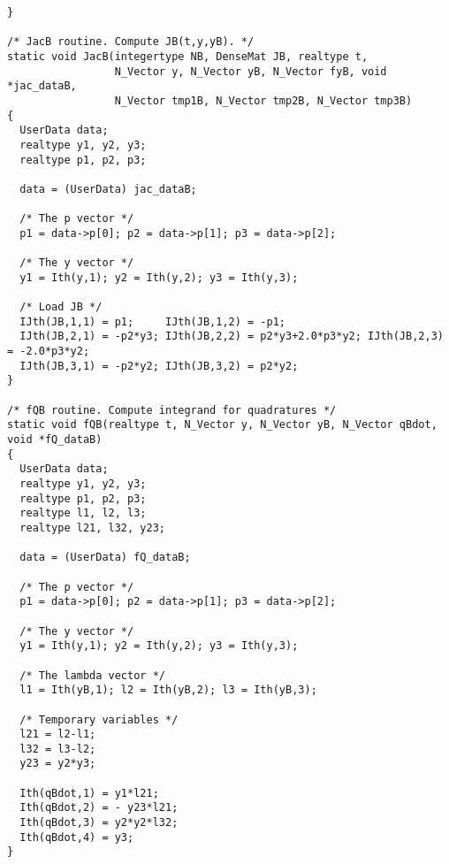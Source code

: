 \begin{verbatim}
}

/* JacB routine. Compute JB(t,y,yB). */
static void JacB(integertype NB, DenseMat JB, realtype t,
                 N_Vector y, N_Vector yB, N_Vector fyB, void *jac_dataB,
                 N_Vector tmp1B, N_Vector tmp2B, N_Vector tmp3B)
{
  UserData data;
  realtype y1, y2, y3;
  realtype p1, p2, p3;
  
  data = (UserData) jac_dataB;

  /* The p vector */
  p1 = data->p[0]; p2 = data->p[1]; p3 = data->p[2];

  /* The y vector */
  y1 = Ith(y,1); y2 = Ith(y,2); y3 = Ith(y,3);

  /* Load JB */
  IJth(JB,1,1) = p1;     IJth(JB,1,2) = -p1; 
  IJth(JB,2,1) = -p2*y3; IJth(JB,2,2) = p2*y3+2.0*p3*y2; IJth(JB,2,3) = -2.0*p3*y2;
  IJth(JB,3,1) = -p2*y2; IJth(JB,3,2) = p2*y2;
}

/* fQB routine. Compute integrand for quadratures */
static void fQB(realtype t, N_Vector y, N_Vector yB, N_Vector qBdot, void *fQ_dataB)
{
  UserData data;
  realtype y1, y2, y3;
  realtype p1, p2, p3;
  realtype l1, l2, l3;
  realtype l21, l32, y23;

  data = (UserData) fQ_dataB;

  /* The p vector */
  p1 = data->p[0]; p2 = data->p[1]; p3 = data->p[2];

  /* The y vector */
  y1 = Ith(y,1); y2 = Ith(y,2); y3 = Ith(y,3);
  
  /* The lambda vector */
  l1 = Ith(yB,1); l2 = Ith(yB,2); l3 = Ith(yB,3);

  /* Temporary variables */
  l21 = l2-l1;
  l32 = l3-l2;
  y23 = y2*y3;

  Ith(qBdot,1) = y1*l21;
  Ith(qBdot,2) = - y23*l21;
  Ith(qBdot,3) = y2*y2*l32;
  Ith(qBdot,4) = y3;
}
\end{verbatim}